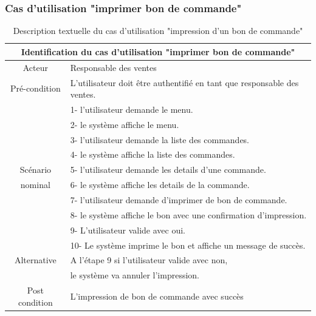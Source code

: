 \documentclass[edit,12pt,a4paper,ChapStyle,oneside,doubleinterligne]{report}
\begin{document}
\subsubsection{Cas d'utilisation "imprimer bon de commande"}
\begin{table}[h!]
    \centering
    \begin{tabular}{|c|m{10cm}|}
        \hline
             \multicolumn{2}{|c|}{Identification du cas d'utilisation "imprimer bon de commande" }\\
             \hline
             Acteur & Responsable des ventes\\
             \hline
             Pré-condition & L'utilisateur doit être authentifié en tant que responsable des ventes. \\
             \hline
              & 1- l'utilisateur demande le menu.\\
              & 2- le système affiche le menu. \\
              & 3- l'utilisateur demande la liste des commandes.\\
              & 4- le système affiche la liste des commandes. \\          
              Scénario&  5- l'utilisateur demande les details d'une commande.\\
              nominal & 6- le système affiche les details de la commande. \\
              & 7- l'utilisateur demande d'imprimer de bon de commande. \\
              & 8- le système affiche le bon avec une confirmation d'impression. \\
              & 9- L'utilisateur valide avec oui.\\
              & 10- Le système imprime le bon et affiche un message de succès.\\
             \hline
             Alternative  & A l’étape 9 si l'utilisateur valide avec non, \\
             & le système va annuler l'impression.\\
             \hline
             Post condition& L’impression de bon de commande avec succès \\
             \hline
        \end{tabular}
    \caption{Description textuelle du cas d'utilisation "impression d'un bon de commande"}
    \label{tab:cas1}
\end{table}
\end{document}
